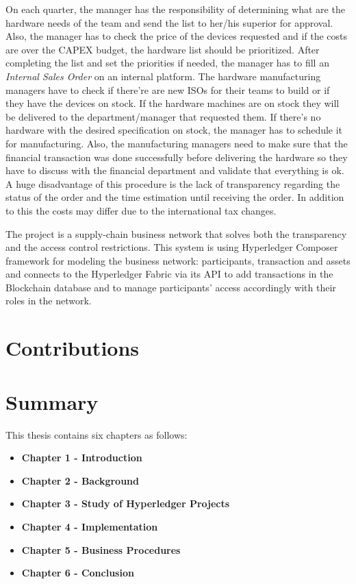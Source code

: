 On each quarter, the manager has the responsibility of determining what are the hardware needs of the team and send the list to her/his superior for approval.
Also, the manager has to check the price of the devices requested and if the costs are over the CAPEX budget, the hardware list should be prioritized. 
After completing the list and set the priorities if needed, the manager has to fill an \emph{Internal Sales Order} on an internal platform. 
The hardware manufacturing managers have to check if there're are new ISOs for their teams to build or if they have the devices on stock. If the hardware machines are on stock they will be delivered to the department/manager that requested them. If there's no hardware with the desired specification on stock, the manager has to schedule it for manufacturing.
Also, the manufacturing managers need to make sure that the financial transaction was done successfully before delivering the hardware so they have to discuss with the financial department and validate that everything is ok.
A huge disadvantage of this procedure is the lack of transparency regarding the status of the order and the time estimation until receiving the order.
In addition to this the costs may differ due to the international tax changes. 

The \textbf{\emph{{\project}}} project is a supply-chain business network that solves both the transparency and the access control restrictions.
This system is using Hyperledger Composer framework for modeling the business network: participants, transaction and assets and connects to the Hyperledger Fabric via its API to add transactions in the Blockchain database and to manage participants' access accordingly with their roles in the network.


\section{Contributions}
\label{sec:intro-sec3}

\section{Summary}
\label{sec:intro-sec4}
This thesis contains six chapters as follows:
\begin{itemize}
	\item \textbf{Chapter 1 - Introduction}
	\item \textbf{Chapter 2 - Background}
	\item \textbf{Chapter 3 - Study of Hyperledger Projects}
	\item \textbf{Chapter 4 - Implementation}
	\item \textbf{Chapter 5 - Business Procedures}
	\item \textbf{Chapter 6 - Conclusion}
\end{itemize}















